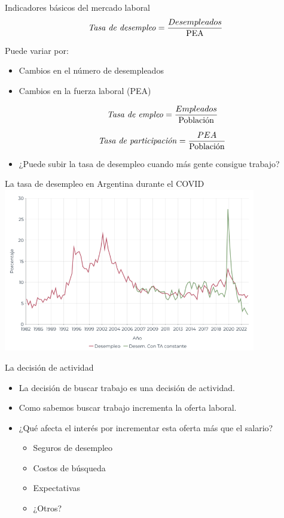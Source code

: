 \documentclass{beamer}
\newcommand\dangersignw[1][2ex]{%
  \scaleto{\stackengine{0.3pt}{\scalebox{1.1}[.9]{%
  \color{red}$\blacktriangle$}}{\color{white}\tiny\bfseries !}{O}{c}{F}{F}{L}}{#1}%
}
\begin{document}
\begin{frame}{Indicadores básicos del mercado laboral}
    \[ \text {\textit{Tasa de desempleo}} = \frac{Desempleados}{\text{PEA}} \]
    
    \dangersignw Puede variar por: 
    \begin{itemize}
        \item Cambios en el número de desempleados
        \item Cambios en la fuerza laboral (PEA)
    
            \[ \text {\textit{Tasa de empleo}} = \frac{Empleados}{\text{Población}} \]

            \[ \text {\textit{Tasa de participación}} = \frac{PEA}{\text{Población}} \]

        \item  ¿Puede subir la tasa de desempleo cuando más gente consigue trabajo?
    \end{itemize}
\end{frame}

\begin{frame}{La tasa de desempleo en Argentina durante el COVID}
\centering\includegraphics[width=11cm]{../Figures/C34.15.png}
\end{frame}

\begin{frame}{La decisión de actividad}
    \begin{itemize}
        \item La decisión de buscar trabajo es una decisión de actividad.
        \item Como sabemos buscar trabajo incrementa la oferta laboral.
        \item ¿Qué afecta el interés por incrementar esta oferta más que el salario?
        \begin{itemize}
            \item Seguros de desempleo
            \item Costos de búsqueda
            \item Expectativas
            \item ¿Otros?
        \end{itemize}
    \end{itemize}
\end{frame}
\end{document}
